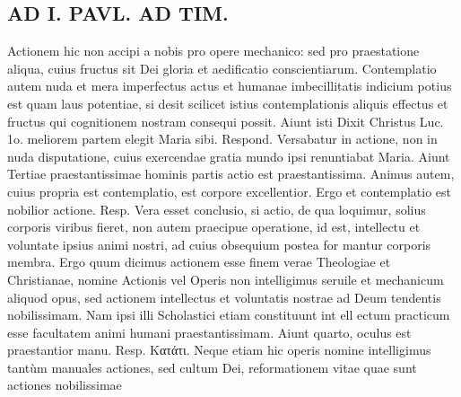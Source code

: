 \documentclass{article}
\begin{document}
\begin{pages}
\section*{AD I. PAVL. AD TIM. }
\marginpar{[ p.14 ]}\pstart Actionem hic non accipi a nobis pro opere mechanico: sed pro praestatione aliqua, cuius fructus sit Dei gloria et aedificatio conscientiarum. Contemplatio autem nuda et mera imperfectus actus et humanae imbecillitatis indicium potius est quam laus potentiae, si desit scilicet istius contemplationis aliquis effectus et fructus qui cognitionem nostram consequi possit.  \pend\pstart Aiunt isti Dixit Christus Luc. 1o. meliorem partem elegit Maria sibi. Respond. Versabatur in actione, non in nuda disputatione, cuius exercendae gratia mundo ipsi renuntiabat Maria.  \pend\pstart Aiunt Tertiae praestantissimae hominis partis actio est praestantissima. Animus autem, cuius propria est contemplatio, est corpore excellentior. Ergo et contemplatio est nobilior actione. Resp. Vera esset conclusio, si actio, de qua loquimur, solius corporis viribus fieret, non autem praecipue operatione, id est, intellectu et voluntate ipsius animi nostri, ad cuius obsequium postea for mantur corporis membra. Ergo quum dicimus actionem esse finem verae Theologiae et Christianae, nomine Actionis vel Operis non intelligimus seruile et mechanicum aliquod opus, sed actionem intellectus et voluntatis nostrae ad Deum tendentis nobilissimam. Nam ipsi illi Scholastici etiam constituunt int ell ectum practicum esse facultatem animi humani praestantissimam.  \pend\pstart Aiunt quarto, oculus est praestantior manu. Resp. Κατάτι. Neque etiam hic operis nomine intelligimus tantùm manuales actiones, sed cultum Dei, reformationem vitae quae sunt actiones nobilissimae  \pend

\end{pages}
\end{document}
